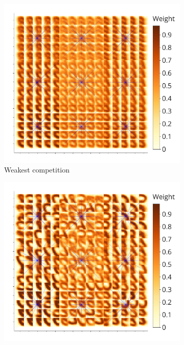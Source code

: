 \documentclass[a4paper]{article}
\begin{document}
\begin{figure}
\centering
\begin{subfigure}{0.45\textwidth} 
    \includegraphics[width=\textwidth,keepaspectratio=true]{competition_on_XY_worst.pdf}
    \caption{Weakest competition}
    \label{fig:worst_competition_distribution}
\end{subfigure}
\begin{subfigure}{0.45\textwidth}
    \includegraphics[width=\textwidth,keepaspectratio=true]{competition_on_XY_medium_bad.pdf}

\end{subfigure}
\end{figure}
\end{document}
